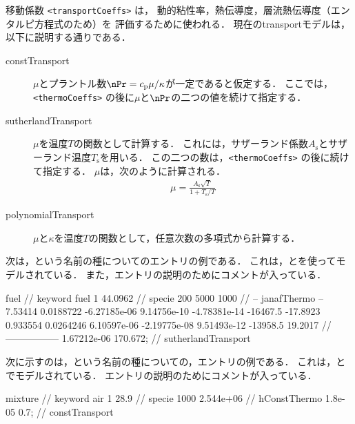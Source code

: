 移動係数 \verb|<transportCoeffs>| は，
動的粘性率，熱伝導度，層流熱伝導度（エンタルピ方程式のため）を
評価するために使われる．
現在のtransportモデルは，以下に説明する通りである．
\begin{description}
 \item[constTransport]
            $\mu$とプラントル数$\nPr = c_{\mathrm{p}}\mu/\kappa$が一定であると仮定する．
            ここでは，\break
            \verb|<thermoCoeffs>| の後に$\mu$と$\nPr$の二つの値を続けて指定する．
 \item[sutherlandTransport]
            $\mu$を温度$T$の関数として計算する．
            これには，サザーランド係数$A_{\mathrm{s}}$とサザーランド温度$T_{\mathrm{s}}$を用いる．
            この二つの数は，\verb|<thermoCoeffs>| の後に続けて指定する．
            $\mu$は，次のように計算される．
\begin{align}
 \label{eq:7.2}
 \mu = \frac{A_{\mathrm{s}}\sqrt{T}}{1 + T_{\mathrm{s}}/T}
\end{align}
 \item[polynomialTransport]
            $\mu$と$\kappa$を温度$T$の関数として，任意次数の多項式から計算する．
\end{description}
次は，という名前の種についてのエントリの例である．
これは，とを使ってモデルされている．
また，エントリの説明のためにコメントが入っている．
\begin{OFverbatim}[file]
fuel                                          // keyword
fuel 1 44.0962                                // specie
200 5000 1000                                 // -- janafThermo --
7.53414 0.0188722 -6.27185e-06 9.14756e-10 -4.78381e-14
-16467.5 -17.8923
0.933554 0.0264246 6.10597e-06 -2.19775e-08 9.51493e-12
-13958.5 19.2017                              // -----------------
1.67212e-06 170.672;                          // sutherlandTransport
\end{OFverbatim}
次に示すのは，という名前の種についての，エントリの例である．
これは，とでモデルされている．
エントリの説明のためにコメントが入っている．
\begin{OFverbatim}[file]
mixture        // keyword
air 1 28.9     // specie
1000 2.544e+06 // hConstThermo
1.8e-05 0.7;   // constTransport
\end{OFverbatim}



